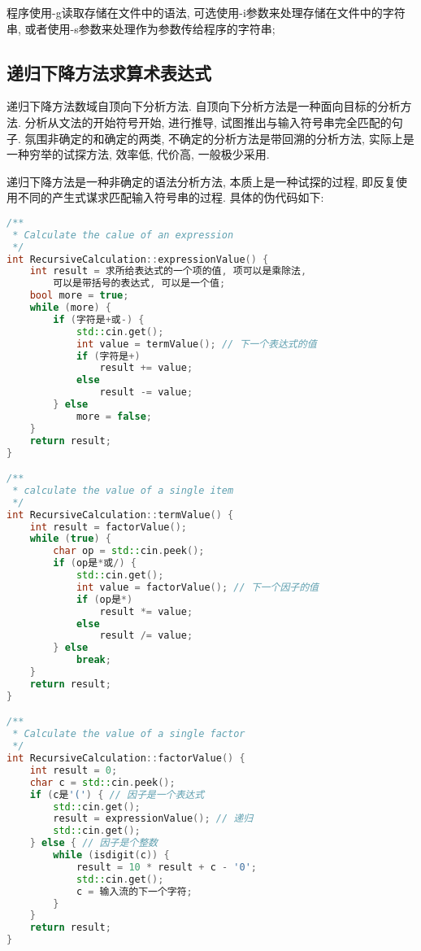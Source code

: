 程序使用-g读取存储在文件中的语法, 可选使用-i参数来处理存储在文件中的字符串,
或者使用-s参数来处理作为参数传给程序的字符串;

\subsection{递归下降方法求算术表达式}
递归下降方法数域自顶向下分析方法. 自顶向下分析方法是一种面向目标的分析方法.
分析从文法的开始符号开始, 进行推导, 试图推出与输入符号串完全匹配的句子.
氛围非确定的和确定的两类, 不确定的分析方法是带回溯的分析方法,
实际上是一种穷举的试探方法, 效率低, 代价高, 一般极少采用.\par

递归下降方法是一种非确定的语法分析方法, 本质上是一种试探的过程,
即反复使用不同的产生式谋求匹配输入符号串的过程. 具体的伪代码如下:
\begin{lstlisting}[language=c++]
/**
 * Calculate the calue of an expression
 */
int RecursiveCalculation::expressionValue() {
    int result = 求所给表达式的一个项的值, 项可以是乘除法,
        可以是带括号的表达式, 可以是一个值;
    bool more = true;
    while (more) {
        if (字符是+或-) {
            std::cin.get();
            int value = termValue(); // 下一个表达式的值
            if (字符是+)
                result += value;
            else
                result -= value;
        } else
            more = false;
    }
    return result;
}

/**
 * calculate the value of a single item
 */
int RecursiveCalculation::termValue() {
    int result = factorValue();
    while (true) {
        char op = std::cin.peek();
        if (op是*或/) {
            std::cin.get();
            int value = factorValue(); // 下一个因子的值
            if (op是*)
                result *= value;
            else
                result /= value;
        } else
            break;
    }
    return result;
}

/**
 * Calculate the value of a single factor
 */
int RecursiveCalculation::factorValue() {
    int result = 0;
    char c = std::cin.peek();
    if (c是'(') { // 因子是一个表达式
        std::cin.get();
        result = expressionValue(); // 递归
        std::cin.get();
    } else { // 因子是个整数
        while (isdigit(c)) {
            result = 10 * result + c - '0';
            std::cin.get();
            c = 输入流的下一个字符;
        }
    }
    return result;
}
\end{lstlisting}

